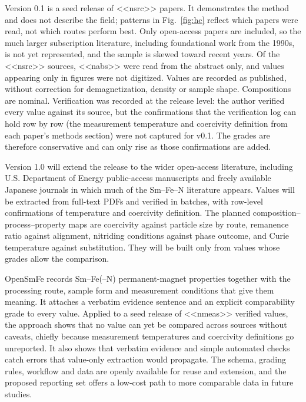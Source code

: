 \documentclass[10pt,twocolumn,letterpaper]{article}
\makeatletter
\renewcommand\section{\@startsection{section}{1}{\z@}{2.2ex plus .5ex}{1.2ex}{\centering\normalfont\small\bfseries\MakeUppercase}}
\renewcommand\subsection{\@startsection{subsection}{2}{\z@}{1.8ex plus .4ex}{1ex}{\centering\normalfont\small\bfseries}}
\makeatother
\begin{document}
Version 0.1 is a seed release of <<nsrc>> papers. It demonstrates the method and does not describe the field; patterns in Fig.~\ref{fig:hc} reflect which papers were read, not which routes perform best. Only open-access papers are included, so the much larger subscription literature, including foundational work from the 1990s, is not yet represented, and the sample is skewed toward recent years. Of the <<nsrc>> sources, <<nabs>> were read from the abstract only, and values appearing only in figures were not digitized. Values are recorded as published, without correction for demagnetization, density or sample shape. Compositions are nominal. Verification was recorded at the release level: the author verified every value against its source, but the confirmations that the verification log can hold row by row (the measurement temperature and coercivity definition from each paper's methods section) were not captured for v0.1. The grades are therefore conservative and can only rise as those confirmations are added.

\subsection{Outlook}

Version 1.0 will extend the release to the wider open-access literature, including U.S. Department of Energy public-access manuscripts and freely available Japanese journals in which much of the Sm--Fe--N literature appears. Values will be extracted from full-text PDFs and verified in batches, with row-level confirmations of temperature and coercivity definition. The planned composition--process--property maps are coercivity against particle size by route, remanence ratio against alignment, nitriding conditions against phase outcome, and Curie temperature against substitution. They will be built only from values whose grades allow the comparison.

\section{Conclusions}

OpenSmFe records Sm--Fe(--N) permanent-magnet properties together with the processing route, sample form and measurement conditions that give them meaning. It attaches a verbatim evidence sentence and an explicit comparability grade to every value. Applied to a seed release of <<nmeas>> verified values, the approach shows that no value can yet be compared across sources without caveats, chiefly because measurement temperatures and coercivity definitions go unreported. It also shows that verbatim evidence and simple automated checks catch errors that value-only extraction would propagate. The schema, grading rules, workflow and data are openly available for reuse and extension, and the proposed reporting set offers a low-cost path to more comparable data in future studies.
\end{document}
